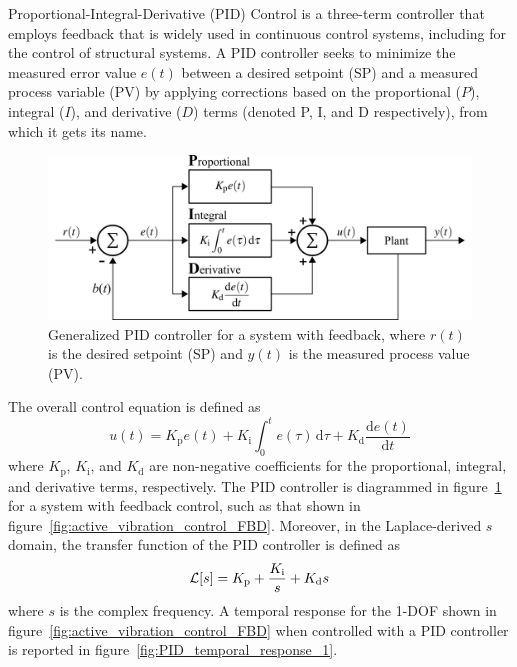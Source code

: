 \documentclass[12pt,letter]{article}
\begin{document}
Proportional-Integral-Derivative (PID) Control is a three-term controller that employs feedback that is widely used in continuous control systems, including for the control of structural systems. A PID controller seeks to minimize the measured error value $e(t)$ between a desired setpoint (SP) and a measured process variable (PV) by applying corrections based on the proportional ($P$), integral ($I$), and derivative ($D$) terms (denoted P, I, and D respectively), from which it gets its name.

\begin{figure}[H]
	\centering
	\includegraphics[]{../figures/controller_PID.png}
	\caption{Generalized PID controller for a system with feedback, where $r(t)$ is the desired setpoint (SP) and $y(t)$ is the measured process value (PV).}
	\label{fig:PID_controller}
\end{figure}





The overall control equation is defined as
\begin{equation}
	u(t) = K_\text{p} e(t) + K_\text{i} \int_0^t e(\tau) \,\mathrm{d}\tau + K_\text{d} \frac{\mathrm{d}e(t)}{\mathrm{d}t}
\end{equation}
where $K_\text{p}$, $K_\text{i}$, and $K_\text{d}$ are non-negative coefficients for the proportional, integral, and derivative terms, respectively. The PID controller is diagrammed in figure~\ref{fig:PID_controller} for a system with feedback control, such as that shown in figure~\ref{fig:active_vibration_control_FBD}. Moreover, in the Laplace-derived $s$ domain, the transfer function of the PID controller is defined as
\begin{equation}
	\mathcal{L}{\left[s\right]} = K_\text{p} + \frac{K_\text{i}}{s} + K_\text{d}s
\end{equation}
where $s$ is the complex frequency. A temporal response for the 1-DOF shown in figure~\ref{fig:active_vibration_control_FBD} when controlled with a PID controller is reported in figure~\ref{fig:PID_temporal_response_1}.
\end{document}
